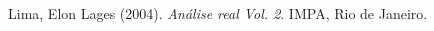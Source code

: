 \documentclass[a4paper, 11pt]{article}
\begin{document}
\theoremstyle{remark}
\newtheorem*{example}{Ejemplo}
\newtheorem*{exercise}{Ejercicio}
\newtheorem*{note}{\(*\)}

\newcommand{\R}{\mathbb{R}}
\newcommand{\E}{\vspace{0.2in}}
\newcommand{\N}{\mathbb{N}}
\newcommand{\U}[3]{\(#1 : U^{ab} \subseteq \R^{#2} \rightarrow \R^{#3}\)}
\newcommand{\ab}{{\rotatebox{0}{\scriptsize$\lor$}}}
\newcommand{\ce}{{\text{\ \large \rotatebox{90}{$\triangleleft$}}}}



 









\begin{thebibliography}{9}


Lima, Elon Lages (2004). \textit{An{\'a}lise real Vol. 2}. IMPA, Rio de Janeiro.

\end{thebibliography}

\end{document}
